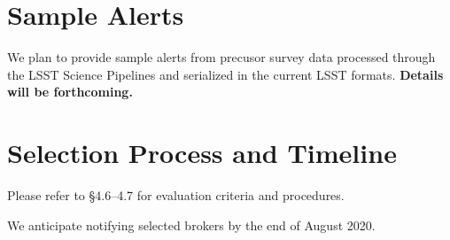\documentclass[DM,toc,lsstdraft]{lsstdoc}
\begin{document}
\section{Sample Alerts}

We plan to provide sample alerts from precusor survey data processed through the LSST Science Pipelines and serialized in the current LSST formats.
\textbf{Details will be forthcoming.}

\section{Selection Process and Timeline}

Please refer to  \S4.6--4.7 for evaluation criteria and procedures.

We anticipate notifying selected brokers by the end of August 2020.

%


\end{document}
